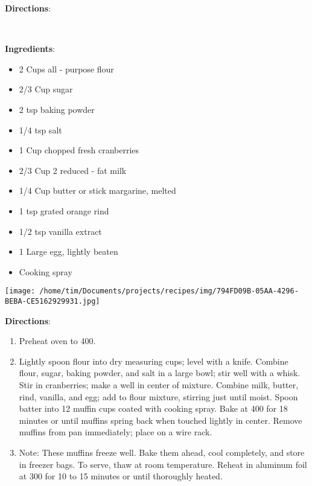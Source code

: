 \documentclass[11pt, twoside, openany]{book}
\begin{document}
\textbf{Directions}:
\vspace{-3mm}\begin{enumerate}\setlength\itemsep{-1mm}
\end{enumerate}
 \label{fresh-cranberry-muffins}\hfill\textit{}\\
\begin{minipage}[t]{0.8\linewidth}
\textbf{Ingredients}:\vspace{-3mm}
\begin{multicols}{2}
\begin{itemize}\setlength\itemsep{-1mm}
\item 2 Cups all - purpose flour
\item 2/3 Cup sugar
\item 2 tsp baking powder
\item 1/4 tsp salt
\item 1 Cup chopped fresh cranberries
\item 2/3 Cup 2 reduced - fat milk
\item 1/4 Cup butter or stick margarine, melted
\item 1 tsp grated orange rind
\item 1/2 tsp vanilla extract
\item 1 Large egg, lightly beaten
\item Cooking spray
\end{itemize}
\end{multicols}
\end{minipage}
\begin{minipage}[t]{0.2\linewidth}
\centering \strut\vspace*{-\baselineskip}\newline
\texttt{[image: /home/tim/Documents/projects/recipes/img/794FD09B-05AA-4296-BEBA-CE5162929931.jpg]}\\
\end{minipage}\vspace{3mm}
\textbf{Directions}:
\vspace{-3mm}\begin{enumerate}\setlength\itemsep{-1mm}
\item Preheat oven to 400.
\item Lightly spoon flour into dry measuring cups; level with a knife. Combine flour, sugar, baking powder, and salt in a large bowl; stir well with a whisk. Stir in cranberries; make a well in center of mixture. Combine milk, butter, rind, vanilla, and egg; add to flour mixture, stirring just until moist. Spoon batter into 12 muffin cups coated with cooking spray. Bake at 400 for 18 minutes or until muffins spring back when touched lightly in center. Remove muffins from pan immediately; place on a wire rack.
\item Note: These muffins freeze well. Bake them ahead, cool completely, and store in freezer bags. To serve, thaw at room temperature. Reheat in aluminum foil at 300 for 10 to 15 minutes or until thoroughly heated.
\end{enumerate}
\end{document}
